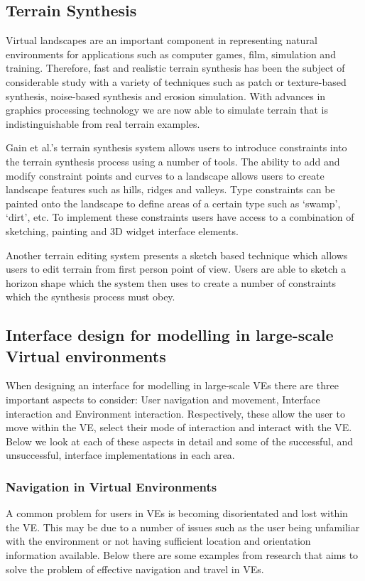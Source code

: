 \documentclass{sig-alternate-05-2015}
\begin{document}
\subsection{Terrain Synthesis} 
Virtual landscapes are an important component in representing natural environments for applications such as computer games, film, simulation and training\cite{Gain2015}. Therefore, fast and realistic terrain synthesis has been the subject of considerable study with a variety of techniques such as patch or texture-based synthesis\cite{Cruz2015, Tasse2012}, noise-based synthesis\cite{Musgrave1989} and erosion simulation\cite{Anh2007}. With advances in graphics processing technology we are now able to simulate terrain that is indistinguishable from real terrain examples\cite{Gain2015}. 

Gain et al.'s terrain synthesis system allows users to introduce constraints into the terrain synthesis process using a number of tools\cite{Gain2015}. The ability to add and modify constraint points and curves to a landscape allows users to create landscape features such as hills, ridges and valleys. Type constraints can be painted onto the landscape to define areas of a certain type such as `swamp', `dirt', etc. To implement these constraints users have access to a combination of sketching, painting and 3D widget interface elements. 

Another terrain editing system presents a sketch based technique which allows users to  edit terrain from first person point of view\cite{Tasse2014}. Users are able to sketch a horizon shape which the system then uses to create a number of constraints which the synthesis process must obey.
\subsection{Interface design for modelling in large-scale Virtual environments}
When designing an interface for modelling in large-scale VEs there are three important aspects to consider: User navigation and movement, Interface interaction and Environment interaction\cite{Bowman2001}. Respectively, these allow the user to move within the VE, select their mode of interaction and interact with the VE. Below we look at each of these aspects in detail and some of the successful, and unsuccessful, interface implementations in each area.
\subsubsection{Navigation in Virtual Environments}
A common problem for users in VEs is becoming disorientated and lost within the VE\cite{Darken1993}. This may be due to a number of issues such as the user being unfamiliar with the environment or not having sufficient location and orientation information available. Below there are some examples from research that aims to solve the problem of effective navigation and travel in VEs.
\end{document}
